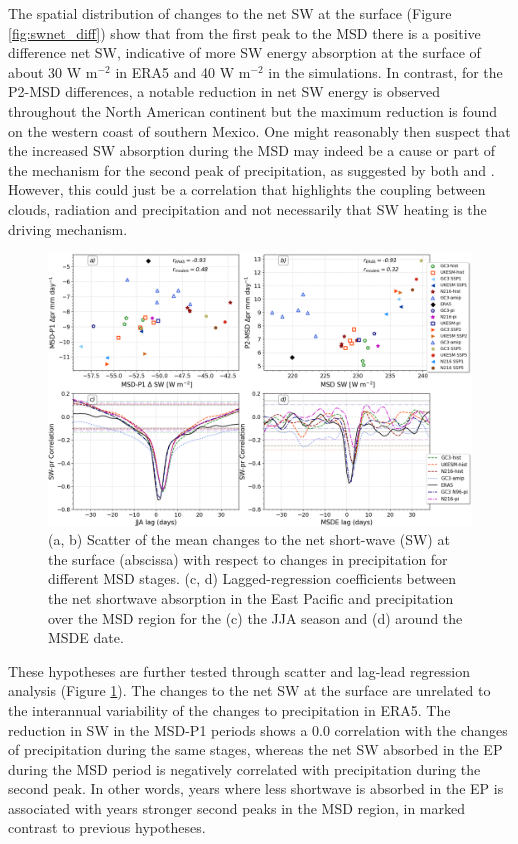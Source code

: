 The spatial distribution of changes to the net SW at the surface (Figure \ref{fig:swnet_diff}) show that from the first peak to the MSD there is a positive difference net SW, indicative of more SW energy absorption at the surface of about 30 W m$^{-2}$ in ERA5 and 40 W m$^{-2}$ in the simulations. In contrast, for the P2-MSD differences, a notable reduction in net SW energy is observed throughout the North American continent but the maximum reduction is found on the western coast of southern Mexico. One might reasonably then suspect that the increased SW absorption during the MSD may indeed be a cause or part of the mechanism for the second peak of precipitation, as suggested by both \cite{magana1999} and \cite{karnauskas2013}. However, this could just be a correlation that highlights the coupling between clouds, radiation and precipitation and not necessarily that SW heating is the driving mechanism.

\begin{figure}[t!]
\includegraphics[width=\linewidth]{figures/cloud_scatter_f.png}
\caption[Scatterplot and lagged-regression of surface short-wave]{(a, b) Scatter of the mean changes to the net short-wave (SW) at the surface (abscissa) with respect to changes in precipitation for different MSD stages. (c, d) Lagged-regression coefficients between the net shortwave absorption in the East Pacific and precipitation over the MSD region for the (c) the JJA season and (d) around the MSDE date.}
\label{fig:cloud_scatter}
\end{figure}

These hypotheses are further tested through scatter and lag-lead regression analysis (Figure \ref{fig:cloud_scatter}). The changes to the net SW at the surface are unrelated to the interannual variability of the changes to precipitation in ERA5. The reduction in SW in the MSD-P1 periods shows a 0.0 correlation with the changes of precipitation during the same stages, whereas the net SW absorbed in the EP during the MSD period is negatively correlated with precipitation during the second peak. In other words, years where less shortwave is absorbed in the EP is associated with years stronger second peaks in the MSD region, in marked contrast to previous hypotheses. 

